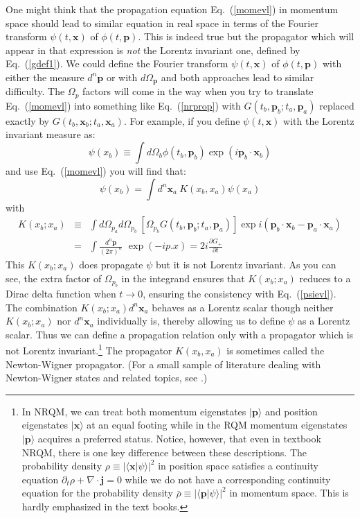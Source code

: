 \documentclass[12pt]{article}
\def\eq#1{{Eq.~(\ref{#1})}}
\def\ket#1{|#1\rangle}                    %
\def\amp#1#2{\langle #1 | #2\rangle}      %
\begin{document}
 One might think that the propagation equation \eq{momevl} in momentum space should lead to similar equation in real space in terms of the Fourier transform $\psi(t,\bm{x})$ of  $\phi(t,\bm{p})$.  This is indeed true but the propagator which will appear in that expression  is \textit{not} the Lorentz invariant one, defined by \eq{gdef1}. We could define the Fourier transform $\psi(t,\bm{x})$ of  $\phi(t,\bm{p})$ with either the measure $d^n\bm{p}$ or with $d\Omega_{\bm{p}}$ and both approaches lead to similar difficulty. The $\Omega_p$ factors will come in the way when you try to translate \eq{momevl} into something like \eq{nrprop} with $G(t_b,\bm{p}_b; t_a,\bm{p}_a)$ replaced exactly by $G(t_b,\bm{x}_b; t_a,\bm{x}_a)$.
 For example, if you define $\psi(t,\bm{x})$ with the  Lorentz invariant measure as:
 \begin{equation}
  \psi(x_b)\equiv \int d\Omega_b \phi(t_b,\bm{p}_b) \exp (i\bm{p}_b\cdot\bm{x}_b)
 \end{equation} 
 and use \eq{momevl} you will find that:
 \begin{equation}
\psi(x_b) = \int d^n \bm{x}_a\ K(x_b, x_a) \psi(x_a) 
\label{psievl}
\end{equation} 
 with
 \begin{eqnarray}
  K({x}_b; {x}_a)&\equiv& \int d\Omega_{p_a}d\Omega_{p_b}\ [\Omega_{p_b}
  G(t_b,\bm{p}_b; t_a,\bm{p}_a)]\exp i(\bm{p}_b \cdot \bm{x}_b -\bm{p}_a \cdot \bm{x}_a)\nonumber\\
  &=&\int  \frac{d^n\bm{p}}{(2\pi)^n}\,  \, \exp(- i p.x) =2i\frac{\partial G_+}{\partial t}
  \label{kxaxb}
 \end{eqnarray} 
This $K({x}_b; {x}_a)$ does propagate $\psi$ but it is not  Lorentz invariant. As you can see, the extra factor of $\Omega_{p_b}$ in the integrand ensures that $K({x}_b; {x}_a)$ reduces to a Dirac delta function when $t\to0$, ensuring the consistency with \eq{psievl}. The combination $K({x}_b; {x}_a)d^n \bm{x}_a$ behaves as a Lorentz scalar though neither $K({x}_b; {x}_a)$ nor $d^n \bm{x}_a$ individually is, thereby allowing us to define $\psi$  as a Lorentz scalar. Thus we can define a propagation relation only with a propagator which is not Lorentz invariant.\footnote{In NRQM, we can treat both momentum eigenstates $\ket{\bm p}$ and position eigenstates $\ket{\bm x}$ at an equal footing while in the RQM momentum eigenstates $\ket{\bm p}$ acquires a preferred status. Notice, however, that even in textbook NRQM, there is one key difference between these descriptions. The probability density $\rho\equiv|\amp{\bm x}{\psi}|^2$ in position space satisfies a continuity equation $\partial_t\rho+\nabla\cdot\bm{j}=0$ while we do not have a corresponding continuity equation for the probability density $\bar\rho\equiv|\amp{\bm p}{\psi}|^2$ in momentum space. This is hardly emphasized in the text books.}
The propagator $K(x_b,x_a)$ is sometimes called the Newton-Wigner propagator. (For a small sample of literature dealing with Newton-Wigner states and related topics, see  
\cite{A1,B,B4,C5,D,F1,F2,F3,F4,F5,F6,F7,F8,F11}.)
\end{document}
